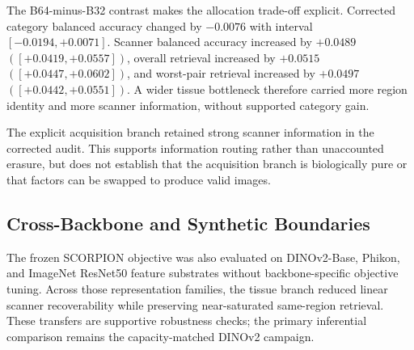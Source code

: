 \begin{table}[t]
\centering
\caption{Corrected five-fold canine SCC representation audit. Values are fold means. Category balanced accuracy is descriptive and not a clinical endpoint.}
\label{tab:canine}
\small
\setlength{\tabcolsep}{6.5pt}
\end{table}

The B64-minus-B32 contrast makes the allocation trade-off explicit. Corrected category balanced accuracy changed by $-0.0076$ with interval $[-0.0194,+0.0071]$. Scanner balanced accuracy increased by $+0.0489$ $([+0.0419,+0.0557])$, overall retrieval increased by $+0.0515$ $([+0.0447,+0.0602])$, and worst-pair retrieval increased by $+0.0497$ $([+0.0442,+0.0551])$. A wider tissue bottleneck therefore carried more region identity and more scanner information, without supported category gain.

The explicit acquisition branch retained strong scanner information in the corrected audit. This supports information routing rather than unaccounted erasure, but does not establish that the acquisition branch is biologically pure or that factors can be swapped to produce valid images.

\subsection{Cross-Backbone and Synthetic Boundaries}
The frozen SCORPION objective was also evaluated on DINOv2-Base, Phikon, and ImageNet ResNet50 feature substrates without backbone-specific objective tuning. Across those representation families, the tissue branch reduced linear scanner recoverability while preserving near-saturated same-region retrieval. These transfers are supportive robustness checks; the primary inferential comparison remains the capacity-matched DINOv2 campaign.


